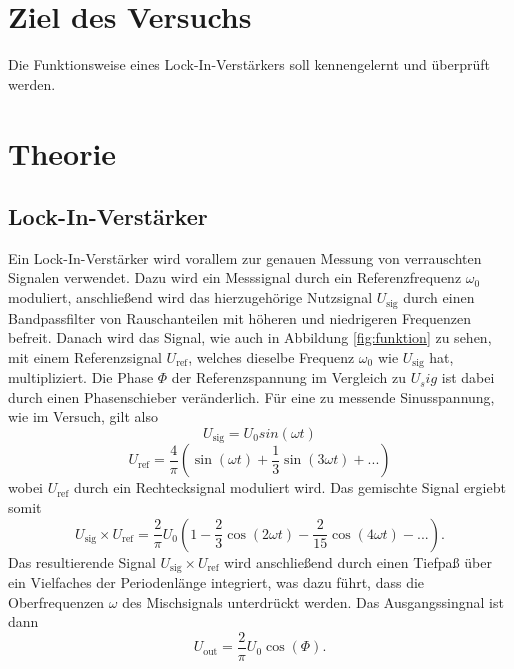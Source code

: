\section{Ziel des Versuchs}
\label{sec:Ziel des Versuchs}
Die Funktionsweise eines Lock-In-Verstärkers soll kennengelernt und überprüft werden.
\section{Theorie}
\label{sec:Theorie}
\subsection{Lock-In-Verstärker}
    Ein Lock-In-Verstärker wird vorallem zur genauen Messung von verrauschten Signalen verwendet.
    Dazu wird ein Messsignal durch ein Referenzfrequenz $\omega_0$ moduliert, anschließend wird das
    hierzugehörige Nutzsignal $U_\text{sig}$ durch einen Bandpassfilter von Rauschanteilen mit höheren und niedrigeren Frequenzen
    befreit. Danach wird das Signal, wie auch in Abbildung \ref{fig:funktion} zu sehen, mit einem Referenzsignal
    $U_\text{ref}$, welches dieselbe Frequenz $\omega_0$ wie $U_\text{sig}$ hat, multipliziert. Die Phase $\Phi$ der Referenzspannung im Vergleich zu $U_sig$
    ist dabei durch einen Phasenschieber veränderlich. 
    Für eine zu messende Sinusspannung, wie im Versuch, gilt also
    \begin{equation}
        U_\text{sig} = U_0 sin(\omega t)
    \end{equation} 
    \begin{equation}
        U_\text{ref} = \frac {4}{\pi} (\sin (\omega t) + \frac {1}{3} \sin(3 \omega t) + ... )
    \end{equation}
    wobei $U_\text{ref}$ durch ein Rechtecksignal moduliert wird. Das gemischte Signal ergiebt somit
    \begin{equation}
        U_\text{sig} \times U_\text{ref} = \frac {2}{\pi} U_0 (1- \frac{2}{3} \cos (2 \omega t) - \frac {2}{15} \cos (4 \omega t) - ...).
    \end{equation}
    Das resultierende Signal $U_\text{sig} \times U_\text{ref}$ wird anschließend durch einen Tiefpaß über ein Vielfaches der Periodenlänge
    integriert, was dazu führt, dass die Oberfrequenzen $\omega$ des Mischsignals unterdrückt werden. Das Ausgangssingnal ist dann
    \begin{equation}
    \label{eqn:u_out}
        U_\text{out} = \frac{2}{\pi} U_0 \cos (\Phi) .
    \end{equation}
